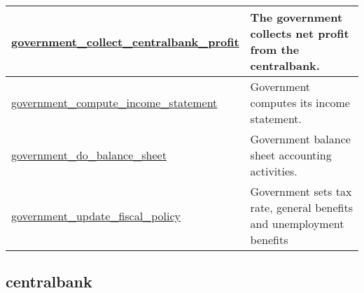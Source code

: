 \documentclass[a4paper,11pt]{article}
\begin{document}
\begin{longtable}[H!]{ll}
\midrule
\parbox{5cm}{\url{government_collect_centralbank_profit}}  & \parbox{10cm}{The government collects net profit from the centralbank.} \\
\midrule
\parbox{5cm}{\url{government_compute_income_statement}}  & \parbox{10cm}{Government computes its income statement.} \\
\midrule
\parbox{5cm}{\url{government_do_balance_sheet}}  & \parbox{10cm}{Government balance sheet accounting activities.} \\
\midrule
\parbox{5cm}{\url{government_update_fiscal_policy}}  & \parbox{10cm}{Government sets tax rate, general benefits and unemployment benefits} \\
\end{longtable}

\subsection{centralbank}
\end{document}
